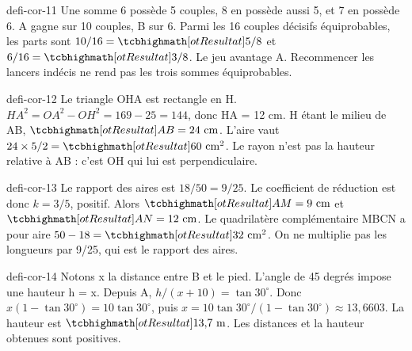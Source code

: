 \begin{blocEdition}{defi-cor-11}
Une somme 6 possède 5 couples, 8 en possède aussi 5, et 7 en possède 6. A gagne sur 10 couples, B sur 6. Parmi les 16 couples décisifs équiprobables, les parts sont $10/16=\res{5/8}$ et $6/16=\res{3/8}$. Le jeu avantage A. Recommencer les lancers indécis ne rend pas les trois sommes équiprobables.
\end{blocEdition}
\begin{blocEdition}{defi-cor-12}
Le triangle OHA est rectangle en H. $HA^2=OA^2-OH^2=169-25=144$, donc HA = 12 cm. H étant le milieu de AB, $\res{AB=24\text{ cm}}$. L’aire vaut $24\times5/2=\res{60\text{ cm}^2}$. Le rayon n’est pas la hauteur relative à AB : c’est OH qui lui est perpendiculaire.\label{fig-defi-cor-12}

\end{blocEdition}
\begin{blocEdition}{defi-cor-13}
Le rapport des aires est $18/50=9/25$. Le coefficient de réduction est donc $k=3/5$, positif. Alors $\res{AM=9\text{ cm}}$ et $\res{AN=12\text{ cm}}$. Le quadrilatère complémentaire MBCN a pour aire $50-18=\res{32\text{ cm}^2}$. On ne multiplie pas les longueurs par 9/25, qui est le rapport des aires.\label{fig-defi-cor-13}

\end{blocEdition}
\begin{blocEdition}{defi-cor-14}
Notons x la distance entre B et le pied. L’angle de 45 degrés impose une hauteur h = x. Depuis A, $h/(x+10)=\tan30^\circ$. Donc $x(1-\tan30^\circ)=10\tan30^\circ$, puis $x=10\tan30^\circ/(1-\tan30^\circ)\approx13{,}6603$. La hauteur est $\res{13{,}7\text{ m}}$. Les distances et la hauteur obtenues sont positives.\label{fig-defi-cor-14}

\end{blocEdition}

